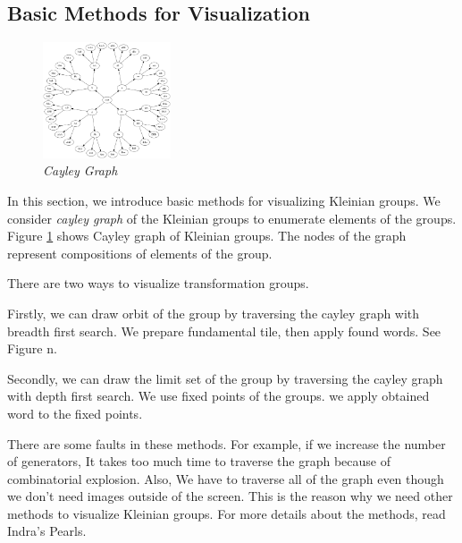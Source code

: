 
\subsection{Basic Methods for Visualization}

\begin{figure}[htbp]
  \center
  \includegraphics[height=1.35in, keepaspectratio]{img/cayleyGraph.png}
  \caption{\textit{Cayley Graph}}
  \label{fig:cayleyGraph}
 \hspace*{\fill}
\end{figure}

In this section, we introduce basic methods for visualizing Kleinian groups.
We consider \textit{cayley graph} of the Kleinian groups to enumerate elements
of the groups.
Figure \ref{fig:cayleyGraph} shows Cayley graph of Kleinian groups. The nodes of the graph
represent compositions of elements of the group.

There are two ways to visualize transformation groups.

Firstly, we can draw orbit of the group by traversing the cayley graph with
breadth first search.
We prepare fundamental tile, then apply found words.
See Figure n.

Secondly, we can draw the limit set of the group by traversing the
cayley graph with depth first search.
We use fixed points of the groups.
we apply obtained word to the fixed points.

There are some faults in these methods.
For example, if we increase the number of generators,
It takes too much time to traverse the graph because of
combinatorial explosion.
Also, We have to traverse all of the graph
even though we don't need images outside of the screen.
This is the reason why we need other methods to visualize Kleinian
groups.
For more details about the methods, read Indra's Pearls.

